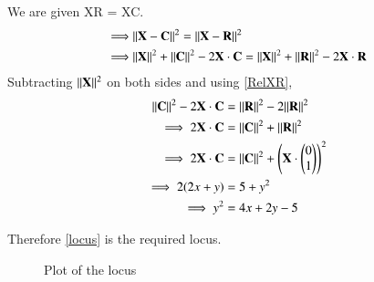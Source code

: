 \documentclass[journal,12pt,twocolumn]{IEEEtran}
\begin{document}
We are given XR = XC.  
\begin{align}
    \implies &\lVert\mathbf{X} - \mathbf{C}\rVert^2 = \lVert\mathbf{X} - \mathbf{R}\rVert^2\\ 
    \implies &\lVert\mathbf{X}\rVert^2+\lVert\mathbf{C}\rVert^2-2\mathbf{X}\cdot \mathbf{C} = \lVert\mathbf{X}\rVert^2+\lVert\mathbf{R}\rVert^2-2\mathbf{X}\cdot \mathbf{R}
\end{align}
Subtracting $\lVert\mathbf{X}\rVert^2$ on both sides and using \ref{RelXR},
\begin{align}
    \lVert\mathbf{C}\rVert^2-2\mathbf{X}\cdot \mathbf{C} &= \lVert\mathbf{R}\rVert^2 - 2\lVert\mathbf{R}\rVert^2\\
    \implies 2\mathbf{X}\cdot \mathbf{C} &= \lVert\mathbf{C}\rVert^2+\lVert\mathbf{R}\rVert^2\\
    \implies 2\mathbf{X}\cdot \mathbf{C} &= \lVert\mathbf{C}\rVert^2+\begin{pmatrix}\mathbf{X}\cdot \begin{pmatrix}0\\1\end{pmatrix}\end{pmatrix}^2\\
    \implies 2(2x+y) &= 5 + y^2\\
    \implies y^2 &= 4x + 2y - 5\label{locus}
\end{align}

Therefore \ref{locus} is the required locus. 
\begin{figure}
    \centering
    \caption{Plot of the locus}
\end{figure}
\end{document}
